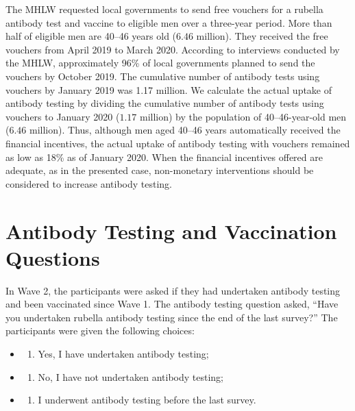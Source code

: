 \documentclass[
    a4paper
]{article}
\providecommand{\tightlist}{%
  \setlength{\itemsep}{0pt}\setlength{\parskip}{0pt}}
\begin{document}
The MHLW requested local governments to send free vouchers for a rubella antibody test and vaccine to eligible men over a three-year period. More than half of eligible men are 40--46 years old (\(6.46\) million). They received the free vouchers from April 2019 to March 2020. According to interviews conducted by the MHLW, approximately 96\% of local governments planned to send the vouchers by October 2019. The cumulative number of antibody tests using vouchers by January 2019 was 1.17 million. We calculate the actual uptake of antibody testing by dividing the cumulative number of antibody tests using vouchers to January 2020 (\(1.17\) million) by the population of 40--46-year-old men (\(6.46\) million). Thus, although men aged 40--46 years automatically received the financial incentives, the actual uptake of antibody testing with vouchers remained as low as 18\% as of January 2020. When the financial incentives offered are adequate, as in the presented case, non-monetary interventions should be considered to increase antibody testing.

\clearpage

\hypertarget{question}{%
\section{Antibody Testing and Vaccination Questions}\label{question}}

In Wave 2, the participants were asked if they had undertaken antibody testing and been vaccinated since Wave 1. The antibody testing question asked, ``Have you undertaken rubella antibody testing since the end of the last survey?'' The participants were given the following choices:

\begin{itemize}
\item
  \begin{enumerate}
  \def\labelenumi{(\alph{enumi})}
  \tightlist
  \item
    Yes, I have undertaken antibody testing;
  \end{enumerate}
\item
  \begin{enumerate}
  \def\labelenumi{(\alph{enumi})}
  \setcounter{enumi}{1}
  \tightlist
  \item
    No, I have not undertaken antibody testing;
  \end{enumerate}
\item
  \begin{enumerate}
  \def\labelenumi{(\alph{enumi})}
  \setcounter{enumi}{2}
  \tightlist
  \item
    I underwent antibody testing before the last survey.
  \end{enumerate}
\end{itemize}
\end{document}
